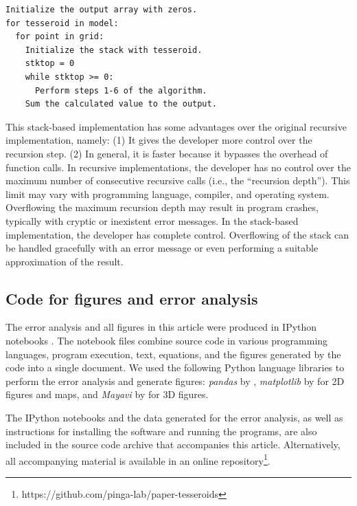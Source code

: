 \begin{verbatim}
Initialize the output array with zeros.
for tesseroid in model:
  for point in grid:
    Initialize the stack with tesseroid.
    stktop = 0
    while stktop >= 0:
      Perform steps 1-6 of the algorithm.
    Sum the calculated value to the output.
\end{verbatim}

This stack-based implementation
has some advantages over the original recursive implementation,
namely:
(1) It gives the developer more control over the recursion step.
(2) In general, it is faster because it bypasses the overhead of function
calls.
In recursive implementations,
the developer has no control over
the maximum number of consecutive recursive calls
(i.e., the ``recursion depth'').
This limit may vary with programming language,
compiler, and operating system.
Overflowing the maximum recursion depth
may result in program crashes,
typically with cryptic or inexistent error messages.
In the stack-based implementation,
the developer has complete control.
Overflowing of the stack can be handled gracefully
with an error message
or even performing a suitable approximation of the result.

\subsection{Code for figures and error analysis}


The error analysis and all figures in this article
were produced in IPython notebooks
\citep{perez2007}.
The notebook files combine source code in various programming languages,
program execution,
text, equations,
and the figures generated by the code
into a single document.
We used the following Python language libraries
to perform the error analysis and generate figures:
\emph{pandas} by \citet{mckinney2010},
\emph{matplotlib} by \citet{hunter2007} for 2D figures and maps,
and \emph{Mayavi} by \citet{ramachandran2011} for 3D figures.

The IPython notebooks
and the data generated for the error analysis,
as well as instructions for installing the software
and running the programs,
are also included in
the source code archive that accompanies this article.
Alternatively,
all accompanying material is available
in an online repository\footnote{
https://github.com/pinga-lab/paper-tesseroids}.



